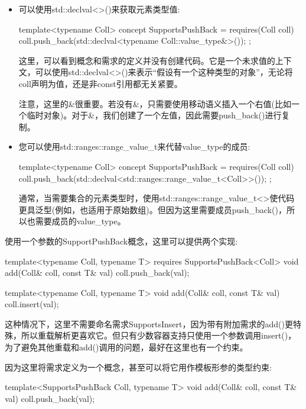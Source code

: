 \begin{itemize}
\item
可以使用std::declval<>()来获取元素类型值:

\begin{cpp}
template<typename Coll>
concept SupportsPushBack = requires(Coll coll) {
	coll.push_back(std::declval<typename Coll::value_type&>());
};
\end{cpp}

这里，可以看到概念和需求的定义并没有创建代码。它是一个未求值的上下文，可以使用std::declval<>()来表示“假设有一个这种类型的对象”，无论将coll声明为值，还是非const引用都无关紧要。

注意，这里的\&很重要。若没有\&，只需要使用移动语义插入一个右值(比如一个临时对象)。对于\&，我们创建了一个左值，因此需要push\_back()进行复制。

\item
您可以使用std::ranges::range\_value\_t来代替value\_type的成员:

\begin{cpp}
template<typename Coll>
concept SupportsPushBack = requires(Coll coll) {
	coll.push_back(std::declval<std::ranges::range_value_t<Coll>>());
};
\end{cpp}

通常，当需要集合的元素类型时，使用std::ranges::range\_value\_t<>使代码更具泛型(例如，也适用于原始数组)。但因为这里需要成员push\_back()，所以也需要成员的value\_type。

\end{itemize}

使用一个参数的SupportPushBack概念，这里可以提供两个实现:

\begin{cpp}
template<typename Coll, typename T>
requires SupportsPushBack<Coll>
void add(Coll& coll, const T& val)
{
	coll.push_back(val);
}

template<typename Coll, typename T>
void add(Coll& coll, const T& val)
{
	coll.insert(val);
}
\end{cpp}

这种情况下，这里不需要命名需求SupportsInsert，因为带有附加需求的add()更特殊，所以重载解析更喜欢它。但只有少数容器支持只使用一个参数调用insert()，为了避免其他重载和add()调用的问题，最好在这里也有一个约束。

因为这里将需求定义为一个概念，甚至可以将它用作模板形参的类型约束:

\begin{cpp}
template<SupportsPushBack Coll, typename T>
void add(Coll& coll, const T& val)
{
	coll.push_back(val);
}
\end{cpp}

